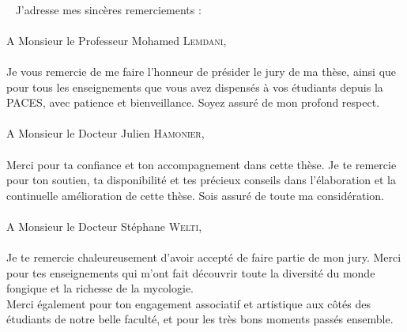 {\cleardoublepage
\cleardoublepage
\cleardoublepage
{\rmfamily
~ \\ ~
J'adresse mes sinc\`{e}res remerciements :
\vspace{5mm}
{\itshape 
\paragraph*{}
A Monsieur le Professeur Mohamed \textsc{Lemdani},
\paragraph*{}
Je vous remercie de me faire l'honneur de pr\'{e}sider le jury de ma th\`{e}se, ainsi que pour tous les enseignements que vous avez dispens\'{e}s \`{a} vos \'{e}tudiants depuis la PACES, avec patience et bienveillance. Soyez assur\'{e} de mon profond respect.
\vspace{5mm}
\paragraph*{}
A Monsieur le Docteur Julien \textsc{Hamonier},
\paragraph*{}
Merci pour ta confiance et ton accompagnement dans cette th\`{e}se. Je te remercie pour ton soutien, ta disponibilit\'{e} et tes pr\'{e}cieux conseils dans l'\'{e}laboration et la continuelle am\'{e}lioration de cette th\`{e}se. Sois assur\'{e} de toute ma consid\'{e}ration.
\vspace{5mm}
\paragraph*{}
A Monsieur le Docteur St\'{e}phane \textsc{Welti},
\paragraph*{}
Je te remercie chaleureusement d'avoir accept\'{e} de faire partie de mon jury.  Merci pour tes enseignements qui m'ont fait d\'{e}couvrir toute la diversit\'{e} du monde fongique et la richesse de la mycologie. \\
Merci \'{e}galement pour ton engagement associatif et artistique aux c\^ {o}t\'{e}s des \'{e}tudiants de notre belle facult\'{e}, et pour les tr\`{e}s bons moments pass\'{e}s ensemble.
\vspace{5mm}
}}}
